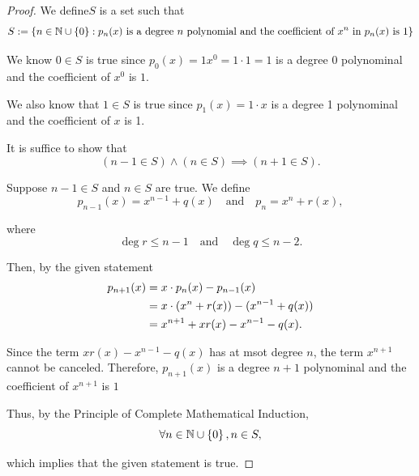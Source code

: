 \begin{proof}
    We define$S$ is a set such that 
    \begin{equation*}
        S := \left\{n \in \mathbb{N} \cup \left\{0\right\} :  p_n(x) \text{ is a degree $n$ polynomial and the coefficient of } x^n \text{ in } p_n(x) \text{ is }1\right\}
    \end{equation*}

    We know $0 \in S$ is true since $p_0(x) = 1x^0 = 1 \cdot 1 = 1$ is a degree 0 polynominal and the coefficient of $x^0$ is $1$. 
    
    We also know that $1 \in S$ is true since $p_1(x) = 1 \cdot x$ is a degree 1 polynominal and the coefficient of $x$ is 1. 

    It is suffice to show that 
    \begin{equation*}
        (n - 1 \in S) \wedge (n \in S) \implies (n + 1 \in S). 
    \end{equation*}

    Suppose $n - 1 \in S$ and $n \in S$ are true. We define 
    \begin{equation*}
        p_{n - 1}(x) = x^{n - 1} + q(x) \quad \text{and} \quad p_{n} = x^n + r(x), 
    \end{equation*} 

    where 
    \begin{equation*}
        \deg r \leq n - 1 \quad \text{and} \quad \deg q \leq n - 2. 
    \end{equation*}

    Then, by the given statement 
    \begin{align*}
        p_{n + 1}(x) &= x \cdot p_{n}(x) - p_{n - 1}(x) \\
        &= x \cdot \left(x^{n} + r(x)\right) - (x^{n - 1} + q(x)) \\
        &= x^{n + 1} + xr(x) - x^{n - 1} - q(x). 
    \end{align*}

    Since the term $xr(x) - x^{n - 1} - q(x)$ has at msot degree $n$, the term $x^{n + 1}$ cannot be canceled. 
    Therefore, $p_{n + 1}(x)$ is a degree $n + 1$ polynominal and the coefficient of $x^{n + 1}$ is $1$ 
    
    Thus, by the Principle of Complete Mathematical Induction, 
    \begin{equation*}
        \forall n \in \mathbb{N} \cup \left\{0\right\}, n \in S, 
    \end{equation*}

    which implies that the given statement is true. 

\end{proof}

